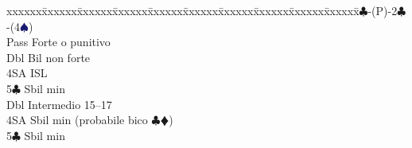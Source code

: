 \documentclass[a4paper,italian]{article}
\newcommand{\BC}{\textcolor{OliveGreen}{$\clubsuit$}}
\newcommand{\BD}{\textcolor{RedOrange}{$\vardiamondsuit$}}
\newcommand{\BS}{\textcolor{MidnightBlue}{$\spadesuit${}}}
\newenvironment{bidtable}
{\begin{tabbing}

    xxxxxx\=xxxxxx\=xxxxxx\=xxxxxx\=xxxxxx\=xxxxxx\=xxxxxx\=xxxxxx\=xxxxxx\=xxxxxx\=\kill}
{\end{tabbing} }%
\newenvironment{attenzione}[1]
{\begin{tcolorbox}[colframe=red!80!white,title=#1]}
    {
\end{tcolorbox} }%
\begin{document}
\begin{attenzione}{Interferenze}
                                    \bigbreak
                                    \begin{bidtable}
                                        1\BC-(P)-2\BC-(4\BS)\+\\
                                        Pass \> Forte o punitivo\+\\
                                        Dbl\> Bil non forte\\
                                        4SA\> ISL\\
                                        5\BC\> Sbil min\-\\
                                        Dbl \> Intermedio 15--17\\
                                        4SA \> Sbil min (probabile bico \BC \BD )\\
                                        5\BC \> Sbil min\-
                                    \end{bidtable}
                                \end{attenzione}
\end{document}
